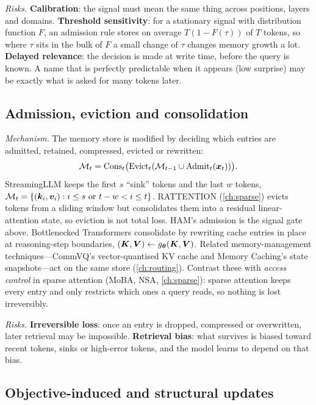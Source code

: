 \emph{Risks.} \textbf{Calibration}: the signal must mean the same thing across positions, layers
and domains. \textbf{Threshold sensitivity}: for a stationary signal with distribution function
$F$, an admission rule stores on average $T(1 - F(\tau))$ of $T$ tokens, so where $\tau$ sits in
the bulk of $F$ a small change of $\tau$ changes memory growth a lot. \textbf{Delayed relevance}:
the decision is made at write time, before the query is known. A name that is perfectly
predictable when it appears (low surprise) may be exactly what is asked for many tokens later.

\subsection{Admission, eviction and consolidation}\label{sec:c02-rule-admit}

\emph{Mechanism.} The memory store is modified by deciding which entries are admitted, retained,
compressed, evicted or rewritten:
\begin{equation}\label{eq:c02-admit}
  \mathcal{M}_t = \mathrm{Cons}_t\big(\mathrm{Evict}_t(\mathcal{M}_{t-1}\cup\mathrm{Admit}_t(\bm{x}_t))\big).
\end{equation}
StreamingLLM \citep{xiao2023streamingllm} keeps the first $s$ ``sink'' tokens and the last $w$ tokens,
$\mathcal{M}_t = \{(\bm{k}_i,\bm{v}_i) : i \le s \text{ or } t - w < i \le t\}$. RATTENTION (\cref{ch:sparse}) evicts
tokens from a sliding window but consolidates them into a residual linear-attention state, so
eviction is not total loss. HAM's admission is the signal gate above. Bottlenecked Transformers
consolidate by rewriting cache entries in place at reasoning-step boundaries,
$(\bm{K}, \bm{V}) \leftarrow g_{\bm{\theta}}(\bm{K}, \bm{V})$. Related memory-management techniques---CommVQ's
vector-quantised KV cache and Memory Caching's state snapshots---act on the same store
(\cref{ch:routing}). Contrast these with \emph{access control} in sparse attention (MoBA, NSA,
\cref{ch:sparse}): sparse attention keeps every entry and only restricts which ones a query reads,
so nothing is lost irreversibly.

\emph{Risks.} \textbf{Irreversible loss}: once an entry is dropped, compressed or overwritten, later
retrieval may be impossible. \textbf{Retrieval bias}: what survives is biased toward recent tokens,
sinks or high-error tokens, and the model learns to depend on that bias.

\subsection{Objective-induced and structural updates}\label{sec:c02-rule-structural}

